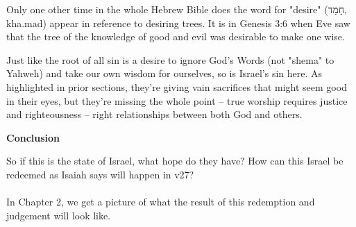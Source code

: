 \documentclass[11pt]{article}
\begin{document}
Only one other time in the whole Hebrew Bible does the word for "desire" (חָמַד, kha.mad) appear in reference to desiring trees.
It is in Genesis 3:6 when Eve saw that the tree of the knowledge of good and evil was desirable to make one wise.

{\vspace{1em}}
Just like the root of all sin is a desire to ignore God's Words (not "shema" to Yahweh) and take our own wisdom for ourselves,
so is Israel's sin here. As highlighted in prior sections, they're giving vain sacrifices that might seem good in their eyes,
but they're missing the whole point – true worship requires justice and righteousness – right relationships between both God and others.

{\vspace{2em}}
{\large\bfseries Conclusion}
{\vspace{1em}}

So if this is the state of Israel, what hope do they have? How can this Israel be redeemed as Isaiah says will happen in v27?
\\\\
In Chapter 2, we get a picture of what the result of this redemption and judgement will look like.
\end{document}
